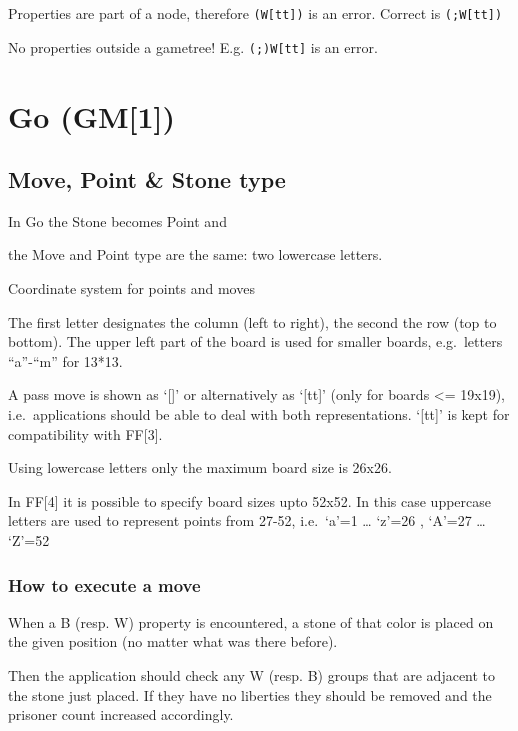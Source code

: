Properties are part of a node, therefore \texttt{(W{[}tt{]})} is an
error. Correct is \texttt{(;W{[}tt{]})}

No properties outside a gametree! E.g. \texttt{(;)W{[}tt{]}} is an
error.

\newpage

\section{Go (GM{[}1{]})}\label{go-gm1}

\subsection{Move, Point \& Stone type}\label{move-point-stone-type}

In Go the Stone becomes Point and

the Move and Point type are the same: two lowercase letters.

Coordinate system for points and moves

The first letter designates the column (left to right), the second the
row (top to bottom). The upper left part of the board is used for
smaller boards, e.g.~letters ``a''-``m'' for 13*13.

A pass move is shown as `{[}{]}' or alternatively as `{[}tt{]}' (only
for boards \textless= 19x19), i.e.~applications should be able to deal
with both representations. `{[}tt{]}' is kept for compatibility with
FF{[}3{]}.

Using lowercase letters only the maximum board size is 26x26.

In FF{[}4{]} it is possible to specify board sizes upto 52x52. In this
case uppercase letters are used to represent points from 27-52,
i.e.~`a'=1 \ldots{} `z'=26 , `A'=27 \ldots{} `Z'=52

\subsubsection{How to execute a move}\label{how-to-execute-a-move}

When a B (resp. W) property is encountered, a stone of that color is
placed on the given position (no matter what was there before).

Then the application should check any W (resp. B) groups that are
adjacent to the stone just placed. If they have no liberties they should
be removed and the prisoner count increased accordingly.

